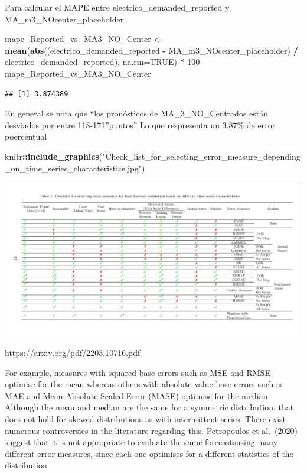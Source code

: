 \documentclass[
]{article}
\newenvironment{Shaded}{\begin{snugshade}}{\end{snugshade}}
\newcommand{\AttributeTok}[1]{\textcolor[rgb]{0.13,0.29,0.53}{#1}}
\newcommand{\ConstantTok}[1]{\textcolor[rgb]{0.56,0.35,0.01}{#1}}
\newcommand{\DecValTok}[1]{\textcolor[rgb]{0.00,0.00,0.81}{#1}}
\newcommand{\FunctionTok}[1]{\textcolor[rgb]{0.13,0.29,0.53}{\textbf{#1}}}
\newcommand{\NormalTok}[1]{#1}
\newcommand{\OtherTok}[1]{\textcolor[rgb]{0.56,0.35,0.01}{#1}}
\newcommand{\SpecialCharTok}[1]{\textcolor[rgb]{0.81,0.36,0.00}{\textbf{#1}}}
\newcommand{\StringTok}[1]{\textcolor[rgb]{0.31,0.60,0.02}{#1}}
\begin{document}
Para calcular el MAPE entre electrico\_demanded\_reported y
MA\_m3\_NOcenter\_placeholder

\begin{Shaded}
\begin{Highlighting}[]
\NormalTok{mape\_Reported\_vs\_MA3\_NO\_Center }\OtherTok{\textless{}{-}} \FunctionTok{mean}\NormalTok{(}\FunctionTok{abs}\NormalTok{((electrico\_demanded\_reported }\SpecialCharTok{{-}}\NormalTok{ MA\_m3\_NOcenter\_placeholder) }\SpecialCharTok{/}\NormalTok{ electrico\_demanded\_reported), }\AttributeTok{na.rm=}\ConstantTok{TRUE}\NormalTok{) }\SpecialCharTok{*} \DecValTok{100}
\NormalTok{mape\_Reported\_vs\_MA3\_NO\_Center}
\end{Highlighting}
\end{Shaded}

\begin{verbatim}
## [1] 3.874389
\end{verbatim}

En general se nota que ``los pronósticos de MA\_3\_NO\_Centrados están
desviados por entre 118-171''puntos'' Lo que respresenta un 3.87\% de
error poercentual

\begin{Shaded}
\begin{Highlighting}[]
\NormalTok{knitr}\SpecialCharTok{::}\FunctionTok{include\_graphics}\NormalTok{(}\StringTok{"Check\_list\_for\_selecting\_error\_measure\_depending\_on\_time\_series\_characteristics.jpg"}\NormalTok{)}
\end{Highlighting}
\end{Shaded}

\includegraphics{Check_list_for_selecting_error_measure_depending_on_time_series_characteristics.jpg}

\url{https://arxiv.org/pdf/2203.10716.pdf}

For example, measures with squared base errors such as MSE and RMSE
optimise for the mean whereas others with absolute value base errors
such as MAE and Mean Absolute Scaled Error (MASE) optimise for the
median. Although the mean and median are the same for a symmetric
distribution, that does not hold for skewed distributions as with
intermittent series. There exist numerous controversies in the
literature regarding this. Petropoulos et al.~(2020) suggest that it is
not appropriate to evaluate the same forecastsusing many different error
measures, since each one optimises for a different statistics of the
distribution
\end{document}
